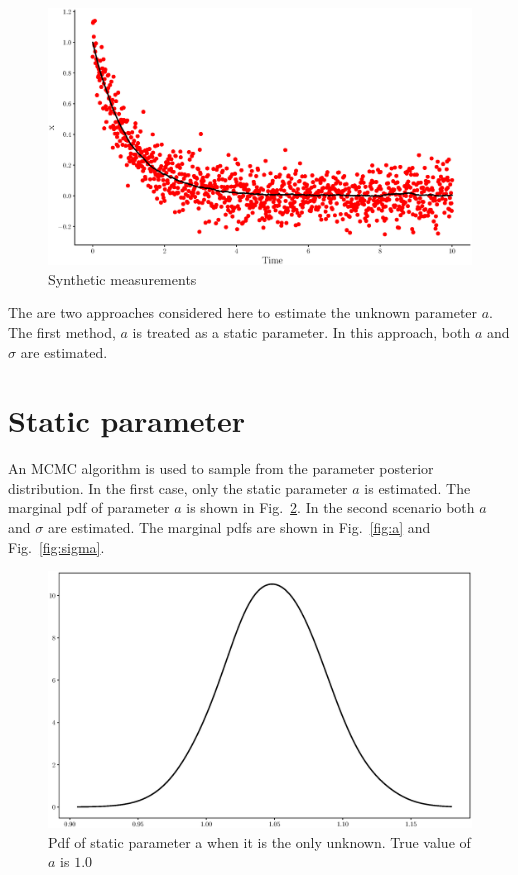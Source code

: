 \documentclass[]{elsarticle}
\begin{document}
\begin{figure}[!htb]
\centering
\includegraphics[width=\linewidth,keepaspectratio]{./figs/case00_data.eps}
\caption{Synthetic measurements}
\label{fig:data}
\end{figure}


The are two approaches considered here to estimate the unknown parameter $a$. The first method, $a$ is treated as a static parameter. In this approach, both $a$ and $\sigma$ are estimated.

\section*{Static parameter}

An MCMC algorithm is used to sample from the parameter posterior distribution. In the first case, only the static parameter $a$ is estimated. The marginal pdf of parameter $a$ is shown in Fig.~\ref{fig:aOnly}. In the second scenario both $a$ and $\sigma$ are estimated. The marginal pdfs are shown in Fig.~\ref{fig:a} and Fig.~\ref{fig:sigma}.

\begin{figure}[!htb]
\centering
\includegraphics[width=\linewidth,keepaspectratio]{./figs/case00_aOnly.eps}
\caption{Pdf of static parameter a when it is the only unknown. True value of $a$ is $1.0$}
\label{fig:aOnly}
\end{figure}
\end{document}
